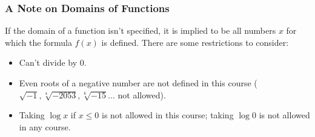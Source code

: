 \begin{frame}
\frametitle{A Note on Domains of Functions}
If the domain of a function isn't specified, it is implied to be all numbers $x$ for which the formula $f(x)$ is defined. There are some restrictions to consider:
\begin{itemize}
\item<2->  Can't divide by $0$.
\item<3->  Even roots of a negative number are not defined in this course ($\sqrt{-1} , \sqrt[4]{-2053}, \sqrt[6]{-15} \ldots$ not allowed).
\item<4->  Taking $\log x$ if $x \leq 0$ is not allowed in this course; taking  $\log 0$ is not allowed in any course.
\end{itemize}
\end{frame}

